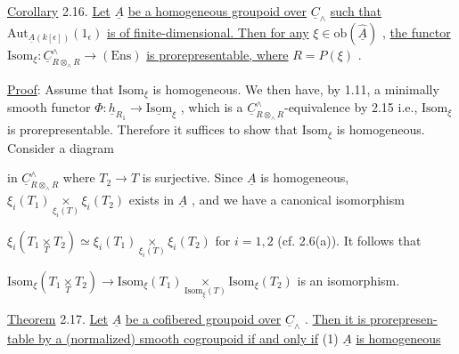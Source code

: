 \underline{Corollary} 2.16.  \underline{Let}  $\underline{A}$  \underline{be a homogeneous groupoid over}  $\underline{C}_{\wedge}$  \underline{such that} $\mathrm{Aut}_{\underline{A}(k[\epsilon])}(1_{\epsilon})$  \underline{is of finite-dimensional. Then for any}  $\xi \in \mathrm{ob}(\hat{\underline{A}})$  , \underline{the functor} $\mathrm{Isom}_{\xi} : \underline{C}^{\wedge}_{R \otimes_{\wedge} R} \longrightarrow (\mathrm{Ens})$  \underline{is prorepresentable, where}  $R = P(\xi)$  .

\underline{Proof}:  Assume that  $\mathrm{Isom}_{\xi}$  is homogeneous. We then have, by 1.11, a minimally smooth functor  $\Phi : \underline{h}_{R_{1}} \to \underline{\mathrm{Isom}}_{\xi}$  , which is a  $\underline{C}^{\wedge}_{R \otimes_{\wedge} R}$-equivalence by 2.15 i.e., $\mathrm{Isom}_{\xi}$  is prorepresentable. Therefore it suffices to show that  $\mathrm{Isom}_{\xi}$  is homogeneous. Consider a diagram

\begin{center}
\end{center}
in  $\underline{C}^{\wedge}_{R \otimes_{\wedge} R}$  where  $T_{2} \longrightarrow T$  is surjective. Since  $\underline{A}$  is homogeneous, $\xi_{i}(T_{1}) \underset{\xi_{i}(T)}{\times} \xi_{i}(T_{2})$  exists in  $\underline{A}$  , and we have a canonical isomorphism

$\xi_{i}(T_{1} \underset{T}{\times} T_{2}) \simeq \xi_{i}(T_{1}) \underset{\xi_{i}(T)}{\times} \xi_{i}(T_{2})$  for  $i = 1,2$  (cf. 2.6(a)). It follows that

$\mathrm{Isom}_{\xi}(T_{1} \underset{T}{\times} T_{2}) \longrightarrow \mathrm{Isom}_{\xi}(T_{1}) \underset{\mathrm{Isom}_{\xi}(T)}{\times} \mathrm{Isom}_{\xi}(T_{2})$  is an isomorphism.

\underline{Theorem} 2.17.  \underline{Let}  $\underline{A}$  \underline{be a cofibered groupoid over}  $\underline{C}_{\wedge}$  . \underline{Then it is prorepresen-table by a (normalized) smooth cogroupoid if and only if}
(1)  $\underline{A}$  \underline{is homogeneous}

